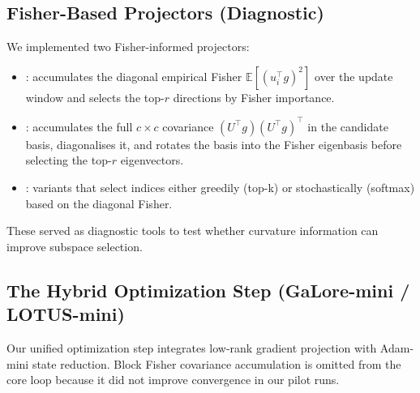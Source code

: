 \documentclass[conference]{IEEEtran}
\begin{document}
\subsection{Fisher-Based Projectors (Diagnostic)}
We implemented two Fisher-informed projectors:
\begin{itemize}
    \item {}: accumulates the diagonal empirical Fisher \( \mathbb{E}[(u_i^\top g)^2] \) over the update window and selects the top-\(r\) directions by Fisher importance.
    \item {}: accumulates the full \(c\times c\) covariance \((U^\top g)(U^\top g)^\top\) in the candidate basis, diagonalises it, and rotates the basis into the Fisher eigenbasis before selecting the top-\(r\) eigenvectors.
    \item {}: variants that select indices either greedily (top-k) or stochastically (softmax) based on the diagonal Fisher.
\end{itemize}
These served as diagnostic tools to test whether curvature information can improve subspace selection.

\subsection{The Hybrid Optimization Step (GaLore-mini / LOTUS-mini)}
Our unified optimization step integrates low-rank gradient projection with Adam-mini state reduction. Block Fisher covariance accumulation is omitted from the core loop because it did not improve convergence in our pilot runs.
\end{document}
